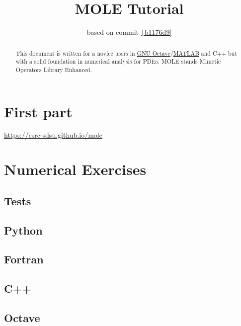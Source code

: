 \documentclass[a4paper,abstract=true]{scrreprt}
\title{\color{DarkBlue}MOLE Tutorial}
\author{based on commit \href{https://github.com/csrc-sdsu/mole/tree/b1176d9969e807fb62bed8fee28bc0eb9648a93a}{\texttt|b1176d9|}}
\begin{document}
\maketitle

\begin{abstract}
    This document is written for a novice users in
    \href{https://octave.org}{GNU Octave}/\href{https://www.mathworks.com/products/matlab.html}{MATLAB}
    and C++ but with a solid
    foundation in numerical analysis for PDEs.
    MOLE stands Mimetic Operators Library Enhanced.
\end{abstract}

\part{First part}

\url{https://csrc-sdsu.github.io/mole}

\part{Numerical Exercises}

\chapter{Tests}

\chapter{Python}

\chapter{Fortran}

\chapter{C++}

\chapter{Octave}
\end{document}
